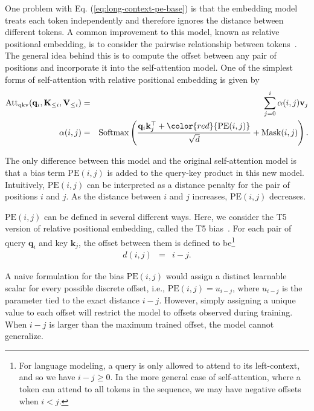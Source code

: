 \noindent One problem with Eq. (\ref{eq:long-context-pe-base}) is that the embedding model treats each token independently and therefore ignores the distance between different tokens. A common improvement to this model, known as relative positional embedding, is to consider the pairwise relationship between tokens~\cite{shaw-etal:2018self}. The general idea behind this is to compute the offset between any pair of positions and incorporate it into the self-attention model. One of the simplest forms of self-attention with relative positional embedding is given by
\begin{eqnarray}
\mathrm{Att}_{\mathrm{qkv}}(\mathbf{q}_i,\mathbf{K}_{\le i},\mathbf{V}_{\le i}) & = & \sum_{j=0}^{i} \alpha(i,j) \mathbf{v}_j \\
\alpha(i,j) & = & \mathrm{Softmax} \left(\frac{\mathbf{q}_i \mathbf{k}_{j}^\top + \color{red}{\mathrm{PE}(i,j)}}{\sqrt{d}} + \mathrm{Mask}(i,j) \right). \label{eq:attention-weight-base-T5}
\end{eqnarray}

\noindent The only difference between this model and the original self-attention model is that a bias term $\mathrm{PE}(i,j)$ is added to the query-key product in this new model. Intuitively, $\mathrm{PE}(i,j)$ can be interpreted as a distance penalty for the pair of positions $i$ and $j$. As the distance between $i$ and $j$ increases, $\mathrm{PE}(i,j)$ decreases.

$\mathrm{PE}(i,j)$ can be defined in several different ways. Here, we consider the T5 version of relative positional embedding, called the T5 bias~\cite{raffel-etal:2020exploring}. For each pair of query $\mathbf{q}_i$ and key $\mathbf{k}_j$, the offset between them is defined to be\footnote{For language modeling, a query is only allowed to attend to its left-context, and so we have $i - j \ge 0$. In the more general case of self-attention, where a token can attend to all tokens in the sequence, we may have negative offsets when $i < j$.
}
\begin{eqnarray}
d(i,j) & = & i - j.
\end{eqnarray}

A naive formulation for the bias $\mathrm{PE}(i,j)$ would assign a distinct learnable scalar for every possible discrete offset, i.e., $\mathrm{PE}(i,j) = u_{i-j}$, where $u_{i-j}$ is the parameter tied to the exact distance $i - j$. However, simply assigning a unique value to each offset will restrict the model to offsets observed during training. When $i-j$ is larger than the maximum trained offset, the model cannot generalize.

